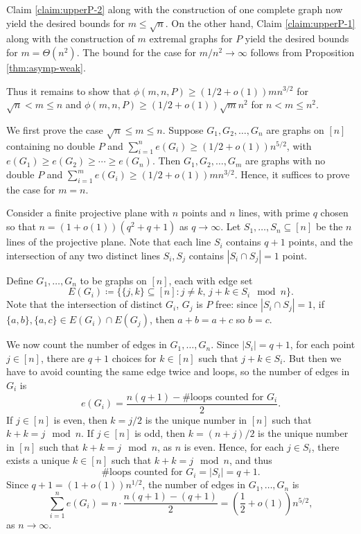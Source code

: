 \documentclass[12pt]{article}
\begin{document}
Claim \ref{claim:upperP-2} along with the construction of one complete graph now yield the desired bounds for $m \leq \sqrt{n}$. On the other hand, Claim \ref{claim:upperP-1} along with the construction of $m$ extremal graphs for $P$ yield the desired bounds for $m = \Theta(n^2)$. The bound for the case for $m/n^2 \to \infty$ follows from Proposition \ref{thm:asymp-weak}. 

Thus it remains to show that $\phi(m, n, P) \geq (1/2 + o(1))mn^{3/2}$ for $\sqrt{n} < m \leq n$ and $\phi(m, n, P) \geq (1/2 + o(1))\sqrt{m}n^2$ for $n < m \leq n^2$. 

We first prove the case $\sqrt{n} \leq m \leq n$. Suppose $G_1, G_2, \ldots, G_n$ are graphs on $[n]$ containing no double $P$ and $\sum_{i = 1}^n e(G_i) \geq (1/2 + o(1))n^{5/2}$, with $e(G_1) \geq e(G_2) \geq \cdots \geq e(G_n)$. Then $G_1, G_2, \ldots, G_m$ are graphs with no double $P$ and $\sum_{i = 1}^m e(G_i) \geq (1/2 + o(1))mn^{3/2}$. Hence, it suffices to prove the case for $m = n$.

Consider a finite projective plane with $n$ points and $n$ lines, with prime $q$ chosen so that $n = (1 + o(1))(q^2 + q + 1)$ as $q \to \infty$. Let $S_1, \ldots, S_n \subseteq [n]$ be the $n$ lines of the projective plane. Note that each line $S_i$ contains $q + 1$ points, and the intersection of any two distinct lines $S_i, S_j$ contains $|S_i \cap S_j| = 1$ point. 

Define $G_1, \ldots, G_n$ to be graphs on $[n]$, each with edge set
\[
  E(G_i) \coloneq \{\{j, k\} \subseteq [n] : j \neq k, \, j + k \in S_i \mod n\}.
\]
Note that the intersection of distinct $G_i$, $G_j$ is $P$ free: since $|S_i \cap S_j| = 1$, if $\{a, b\}, \{a, c\} \in E(G_i) \cap E(G_j)$, then $a + b = a + c$ so $b = c$. 

We now count the number of edges in $G_1, \ldots, G_n$. Since $|S_i| = q + 1$, for each point $j \in [n]$, there are $q + 1$ choices for $k \in [n]$ such that $j + k \in S_i$. But then we have to avoid counting the same edge twice and loops, so the number of edges in $G_i$ is
\[
  e(G_i) = \frac{n(q + 1) - \#\text{loops counted for } G_i}{2}.
\]
If $j \in [n]$ is even, then $k = j/2$ is the unique number in $[n]$ such that $k + k = j \mod n$. If $j \in [n]$ is odd, then $k = (n + j)/2$ is the unique number in $[n]$ such that $k + k = j \mod n$, as $n$ is even. Hence, for each $j \in S_i$, there exists a unique $k \in [n]$ such that $k + k = j \mod n$, and thus
\[
  \#\text{loops counted for } G_i = |S_i| = q + 1.
\]
Since $q + 1 = (1 + o(1))n^{1/2}$, the number of edges in $G_1, \ldots, G_n$ is
\[
  \sum_{i = 1}^n e(G_i) = n \cdot \frac{n(q + 1) - (q + 1)}{2} = \left(\frac{1}{2} + o(1)\right)n^{5/2},
\]
as $n \to \infty$. 
\end{document}
